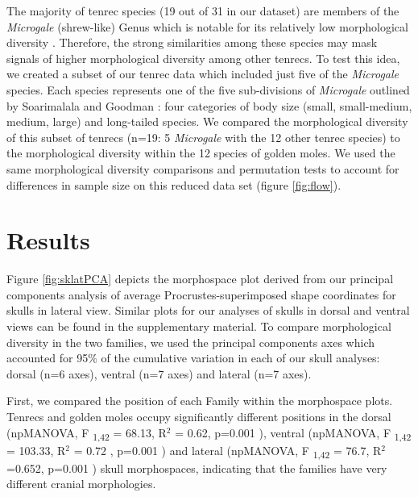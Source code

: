 \documentclass[12pt,a4paper]{article}
\begin{document}
	The majority of tenrec species (19 out of 31 in our dataset) are members of the \textit{Microgale} (shrew-like) Genus which is notable for its relatively low morphological diversity \citep{Soarimalala2011, Jenkins2003}. Therefore, the strong similarities among these species may mask signals of higher morphological diversity among other tenrecs. 
	To test this idea, we created a subset of our tenrec data which included just five of the \textit{Microgale} species. Each species represents one of the five sub-divisions of \textit{Microgale} outlined by Soarimalala and Goodman \citeyearpar{Soarimalala2011}: four categories of body size (small, small-medium, medium, large) and long-tailed species. We compared the morphological diversity of this subset of tenrecs (n=19: 5 \textit{Microgale} with the 12 other tenrec species) to the morphological diversity within the 12 species of golden moles. We used the same morphological diversity comparisons and permutation tests to account for differences in sample size on this reduced data set (figure \ref{fig:flow}).
	 



\section{Results}
 
	Figure \ref{fig:sklatPCA} depicts the morphospace plot derived from our principal components analysis of average Procrustes-superimposed shape coordinates for skulls in lateral view. Similar plots for our analyses of skulls in dorsal and ventral views can be found in the supplementary material.
	To compare morphological diversity in the two families, we used the principal components axes which accounted for 95\% of the cumulative variation in each of our skull analyses: dorsal (n=6 axes), ventral (n=7 axes) and lateral (n=7 axes). 
	
	First, we compared the position of each Family within the morphospace plots. Tenrecs and golden moles occupy significantly different positions in the dorsal 	(npMANOVA, F \textsubscript{1,42} = 68.13, R$^2$ = 0.62, p=0.001 ), ventral (npMANOVA, F \textsubscript{1,42} = 103.33, R$^2$ = 0.72 , p=0.001 ) and lateral (npMANOVA, F \textsubscript{1,42} = 76.7, R$^2$=0.652, p=0.001 ) skull morphospaces,  indicating that the families have very different cranial morphologies. 
\end{document}
